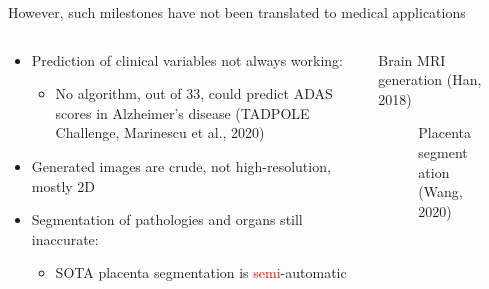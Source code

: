 \documentclass[8pt,xcolor=table]{beamer}
\begin{document}
\begin{frame}{However, such milestones have not been translated to medical applications}

\begin{columns}
\begin{column}{0.5\textwidth}
\centering

\begin{itemize}
\item Prediction of clinical variables not always working: 
\begin{itemize}
\item No algorithm, out of 33, could predict ADAS scores in Alzheimer's disease (TADPOLE Challenge, Marinescu et al., 2020)
\end{itemize}
\vspace{2em}

\item Generated images are crude, not high-resolution, mostly 2D

\vspace{2em}

\item Segmentation of pathologies and organs still inaccurate:
\begin{itemize}
\item SOTA placenta segmentation is \textcolor{red}{semi}-automatic
\end{itemize}


\end{itemize}


\end{column}
\begin{column}{0.5\textwidth}
\centering
Brain MRI generation (Han, 2018)
\begin{figure}

\vo


Placenta segmentation (Wang, 2020)


\end{figure}
\end{column}
\end{columns}

 
 
\end{frame}
\end{document}
